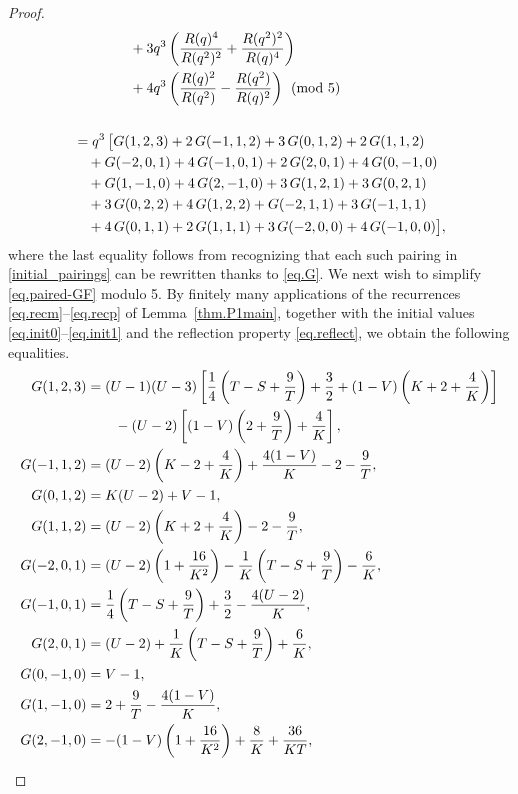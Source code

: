 \documentclass{amsart}
\theoremstyle{definition}
\def\myalpha{R(q)}
\def\mybeta{R(q^2)}
\begin{document}
\begin{proof}
\begin{align}
& \qquad\qquad +3q^{3}\left(\frac{\myalpha^{4}}{\mybeta^{2}}+\frac{\mybeta^{2}}{\myalpha^{4}}\right) \notag\\
& \qquad\qquad +4q^{3}\left(\frac{\myalpha^{2}}{\mybeta}-\frac{\mybeta}{\myalpha^{2}}\right) \pmod5\notag\\
& \notag\\
\label{eq.paired-GF}& ={} q^{3}\,\bigl[G(1,2,3)+2\,G(-1,1,2)+3\,G(0,1,2)+2\,G(1,1,2)\\
&\quad+G(-2,0,1)+4\,G(-1,0,1)+2\,G(2,0,1)+4\,G(0,-1,0)\notag\\
&\quad+G(1,-1,0)+4\,G(2,-1,0)+3\,G(1,2,1)+3\,G(0,2,1)\notag\\
&\quad+3\,G(0,2,2)+4\,G(1,2,2)+G(-2,1,1)+3\,G(-1,1,1)\notag\\
&\quad+4\,G(0,1,1)+2\,G(1,1,1)+3\,G(-2,0,0)+4\,G(-1,0,0)\bigr],\notag
\end{align}
where the last equality follows from recognizing that each such pairing in \eqref{initial_pairings} can be rewritten thanks to \eqref{eq.G}. We next wish to simplify \eqref{eq.paired-GF} modulo 5. By finitely many applications of the recurrences \eqref{eq.recm}--\eqref{eq.recp} of
Lemma~\ref{thm.P1main}, together with the initial values \eqref{eq.init0}--\eqref{eq.init1} and the reflection property \eqref{eq.reflect}, we obtain the following equalities.
\begin{align}\label{eq.exactlist}
G(1,2,3)&=(U-1)(U-3)\left[\frac14\left(T-S+\frac9T\right)+\frac32
+(1-V)\left(K+2+\frac4K\right)\right]\notag\\
&\qquad{}-(U-2)\left[(1-V)\left(2+\frac9T\right)+\frac4K\right],\notag
\\
G(-1,1,2)&=(U-2)\left(K-2+\frac4K\right)+\frac{4(1-V)}{K}-2-\frac9T,\notag
\\
G(0,1,2)&=K(U-2)+V-1,\notag
\\
G(1,1,2)&=(U-2)\left(K+2+\frac4K\right)-2-\frac9T,\notag
\\
G(-2,0,1)&=(U-2)\left(1+\frac{16}{K^{2}}\right)-\frac1K\left(T-S+\frac9T\right)-\frac6K,\notag
\\
G(-1,0,1)&=\frac14\left(T-S+\frac9T\right)+\frac32-\frac{4(U-2)}{K},\notag
\\
G(2,0,1)&=(U-2)+\frac1K\left(T-S+\frac9T\right)+\frac6K,\notag
\\
G(0,-1,0)&=V-1,\notag
\\
G(1,-1,0)&=2+\frac9T-\frac{4(1-V)}{K},
\\
G(2,-1,0)&=-(1-V)\left(1+\frac{16}{K^{2}}\right)+\frac8K+\frac{36}{KT},\notag
\\[2pt]

\end{align}
\end{proof}
\end{document}
